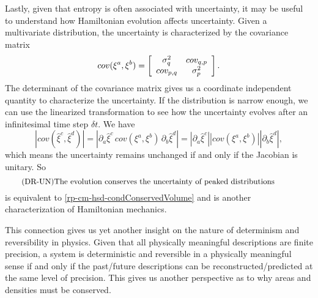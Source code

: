 Lastly, given that entropy is often associated with uncertainty, it may be useful to understand how Hamiltonian evolution affects uncertainty. Given a multivariate distribution, the uncertainty is characterized by the covariance matrix
\begin{equation}
	cov(\xi^a, \xi^b) = \left[\begin{array}{ c c }
		\sigma^2_q & cov_{q, p} \\
		cov_{p, q} & \sigma^2_p \\
	\end{array} \right].
\end{equation}
The determinant of the covariance matrix gives us a coordinate independent quantity to characterize the uncertainty. If the distribution is narrow enough, we can use the linearized transformation to see how the uncertainty evolves after an infinitesimal time step $\delta t$. We have
\begin{equation}
	\left| cov(\hat{\xi}^c, \hat{\xi}^d) \right| = \left| \partial_a \hat{\xi}^c  \, cov(\xi^a, \xi^b) \, \partial_b \hat{\xi}^d  \right| = \left| \partial_a \hat{\xi}^c \right| \left| cov(\xi^a, \xi^b) \right| \left| \partial_b \hat{\xi}^d  \right|,
\end{equation}
which means the uncertainty remains unchanged if and only if the Jacobian is unitary. So
\begin{equation}\label{rp-cm-hsd-condUncertainty}
	\tag{DR-UN}
	\eqtext{The evolution conserves the uncertainty of peaked distributions}	
\end{equation}
is equivalent to \ref{rp-cm-hsd-condConservedVolume} and is another characterization of Hamiltonian mechanics.

This connection gives us yet another insight on the nature of determinism and reversibility in physics. Given that all physically meaningful descriptions are finite precision, a system is deterministic and reversible in a physically meaningful sense if and only if the past/future descriptions can be reconstructed/predicted at the same level of precision. This gives us another perspective as to why areas and densities must be conserved.

